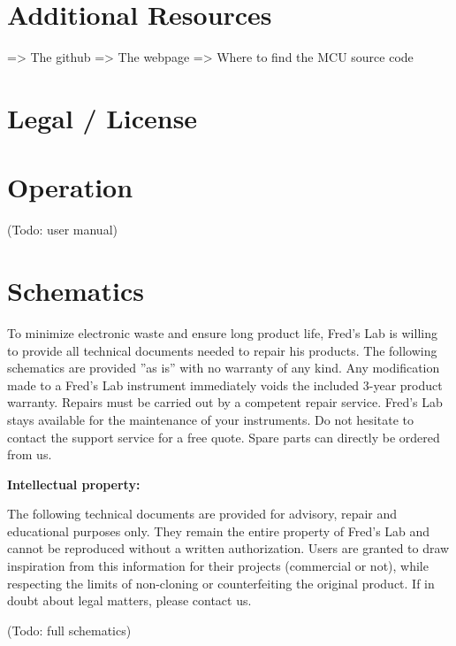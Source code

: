 \documentclass{scrartcl}
\begin{document}
\section{Additional Resources}

=> The github
=> The webpage
=> Where to find the MCU source code

\pagebreak


\section{Legal / License}

\pagebreak


\section{Operation}

 (Todo: user manual)


\section{Schematics}

To minimize electronic waste and ensure long product life, Fred’s Lab is willing to provide all technical documents needed to repair his products. The following schematics are provided ”as is” with no warranty of any kind. Any modification made to a Fred’s Lab instrument immediately voids the included 3-year product warranty. Repairs must be carried out by a competent repair service. Fred’s Lab stays available for the maintenance of your instruments. Do not hesitate to contact the support service for a free quote. Spare parts can directly be ordered from us.

\textbf{Intellectual property:}

The following technical documents are provided for advisory, repair and educational purposes only. They remain the entire property of Fred's Lab and cannot be reproduced without a written authorization. Users are granted to draw inspiration from this information for their projects (commercial or not), while respecting the limits of non-cloning or counterfeiting the original product. If in doubt about legal matters, please contact us.

\begin{center}
    (Todo: full schematics)
\end{center}
\end{document}
